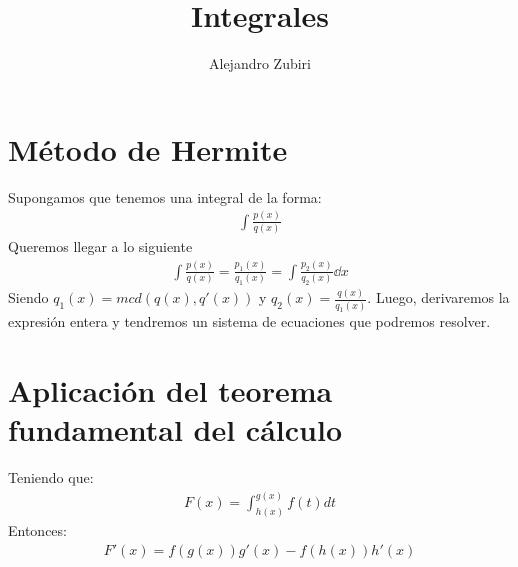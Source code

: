 \documentclass{article}
\author{Alejandro Zubiri}
\title{Integrales}
\begin{document}
\maketitle
\tableofcontents
\pagebreak
\section{Método de Hermite}
Supongamos que tenemos una integral de la forma:
\begin{equation}
	\begin{split}
		\int \frac{p(x)}{q(x)}
	\end{split}
\end{equation}
Queremos llegar a lo siguiente
\begin{equation}
	\begin{split}
		\int \frac{p(x)}{q(x)} = \frac{p_{1}(x)}{q_{1}(x)}=
		\int \frac{p_{2}(x)}{q_{2}(x)} \dd{x}
	\end{split}
\end{equation}
Siendo $q_{1}(x) = mcd(q(x), q'(x))$ y $q_{2}(x)= \frac{q(x)}{q_{1}(x)}$.
Luego, derivaremos la expresión entera y tendremos un sistema de ecuaciones que
podremos resolver.
\section{Aplicación del teorema fundamental del cálculo}
Teniendo que:
\begin{equation}
	\begin{split}
		F(x) = \int_{h(x)}^{g(x)} f(t) dt
	\end{split}
\end{equation}
Entonces:
\begin{equation}
	\begin{split}
		F'(x) = f(g(x))g'(x) - f(h(x))h'(x)
	\end{split}
\end{equation}
\end{document}
